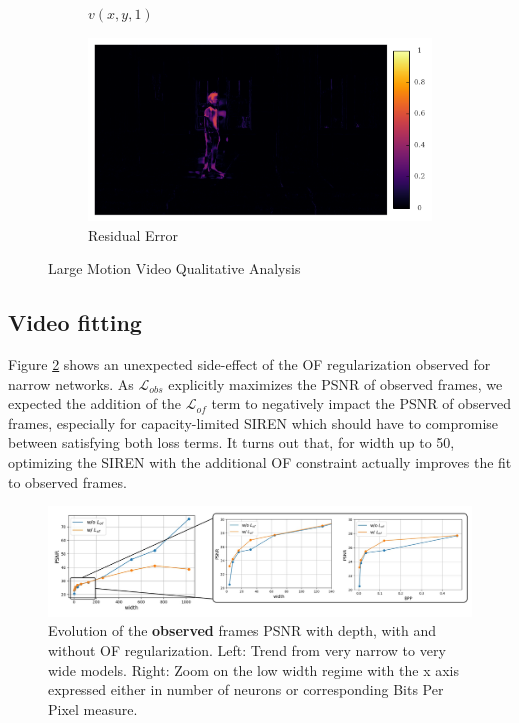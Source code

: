 \documentclass{article}
\begin{document}
\begin{figure}[h]
\begin{subfigure}{0.2\textwidth}
    \caption{$v(x,y,1)$}
\end{subfigure}%
\begin{subfigure}{0.2\textwidth}
	\centering
    \includegraphics[width=1\linewidth]{nd_scene/Skating_error.png}
    \caption{Residual Error}
\end{subfigure}
\caption{Large Motion Video Qualitative Analysis}
\label{fig_large}
\end{figure}


\subsection{Video fitting}

Figure \ref{fig_video_fit} shows an unexpected side-effect of the OF regularization observed for narrow networks.
As $\mathcal{L}_{obs}$ explicitly maximizes the PSNR of observed frames,
we expected the addition of the $\mathcal{L}_{of}$ term to negatively impact the PSNR of observed frames,
especially for capacity-limited SIREN which should have to compromise between satisfying both loss terms.
It turns out that, for width up to 50, optimizing the SIREN with the additional OF constraint
actually improves the fit to observed frames.

\label{sec_video_fit}
\begin{figure}[h]
\centering
\includegraphics[width=1\textwidth]{compression.png}
\caption{Evolution of the \textbf{observed} frames PSNR with depth, with and without OF regularization.
Left: Trend from very narrow to very wide models.
Right: Zoom on the low width regime with the x axis expressed either in number of neurons or corresponding Bits Per Pixel measure.}
\label{fig_video_fit}
\end{figure}
\end{document}
